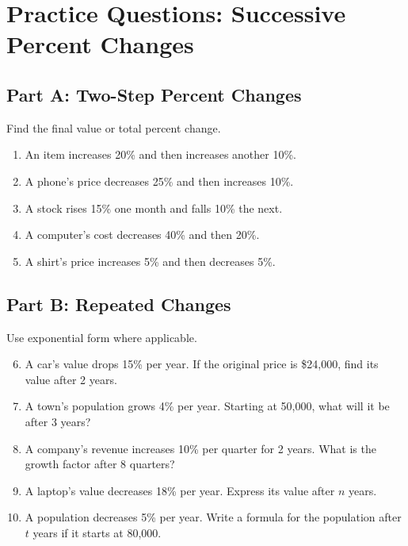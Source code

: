 \documentclass[12pt]{article}
\begin{document}
\newpage


\section*{Practice Questions: Successive Percent Changes}

\subsection*{Part A: Two-Step Percent Changes}
Find the final value or total percent change.
\begin{enumerate}
  \item An item increases 20\% and then increases another 10\%.
  \item A phone’s price decreases 25\% and then increases 10\%.
  \item A stock rises 15\% one month and falls 10\% the next.
  \item A computer’s cost decreases 40\% and then 20\%.
  \item A shirt’s price increases 5\% and then decreases 5\%.
\end{enumerate}

\subsection*{Part B: Repeated Changes}
Use exponential form where applicable.
\begin{enumerate}
  \setcounter{enumi}{5}
  \item A car’s value drops 15\% per year. If the original price is \$24,000, find its value after 2 years.
  \item A town’s population grows 4\% per year. Starting at 50,000, what will it be after 3 years?
  \item A company’s revenue increases 10\% per quarter for 2 years. What is the growth factor after 8 quarters?
  \item A laptop’s value decreases 18\% per year. Express its value after \(n\) years.
  \item A population decreases 5\% per year. Write a formula for the population after \(t\) years if it starts at 80,000.
\end{enumerate}
\end{document}
